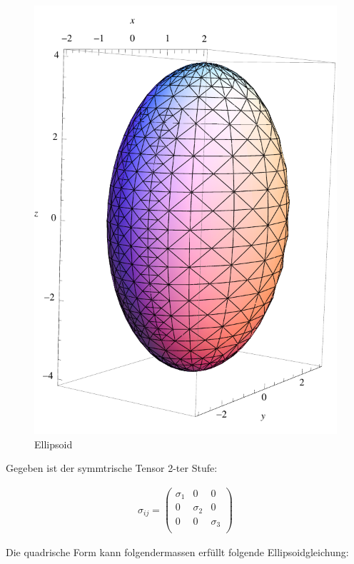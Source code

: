 \documentclass[a4paper]{scrartcl}
\begin{document}
\begin{figure}[h]
\begin{center}
\includegraphics[scale=0.5]{images/ellipsoid.pdf}
\caption{Ellipsoid}
\label{fig:ellipsoid}
\end{center}
\end{figure}

Gegeben ist der symmtrische Tensor 2-ter Stufe:

\begin{align}
\sigma_{ij}=\begin{pmatrix}
\sigma_1 & 0 & 0 \\
0 & \sigma_2 & 0 \\
0 & 0 & \sigma_3 \\
\end{pmatrix}
\end{align}

Die quadrische Form kann folgendermassen erfüllt folgende Ellipsoidgleichung:
\end{document}
